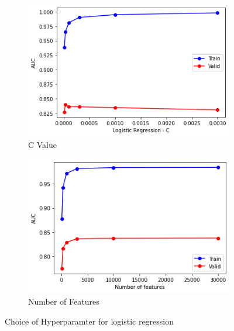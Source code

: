 \documentclass[11pt,a4paper]{article}
\begin{document}
\begin{figure}[h!]
	\centering
	\begin{subfigure}[b]{0.475\textwidth}
		\centering
		\includegraphics[width=\textwidth]{prm1}
		\caption[Network2]%
		{{\small C Value}}    

	\end{subfigure}
	\hfill
	\begin{subfigure}[b]{0.475\textwidth}  
		\centering 
		\includegraphics[width=\textwidth]{prm2}
		\caption[]%
		{{\small Number of Features}}    
	\end{subfigure}
\caption{Choice of Hyperparamter for logistic regression}
\label{learning}
\end{figure}
\end{document}
